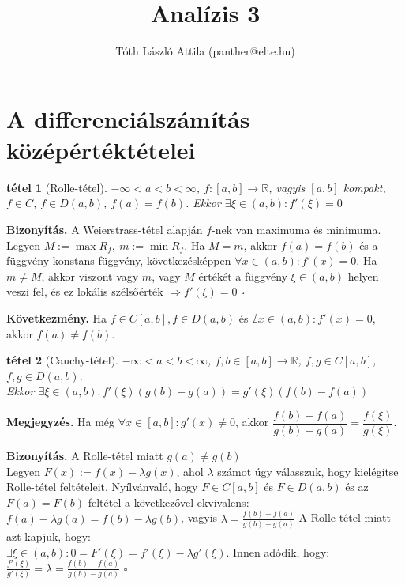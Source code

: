 \documentclass{article}
\title {Analízis 3}
\author{Tóth László Attila (panther@elte.hu)}
\newcommand{\ob}{\hfill$\square$}
\newcommand{\fabk}{f\colon \left[a,b\right]\rightarrow\mathbb{R}}
\newcommand{\fdab}{f\in D(a,b)}
\newcommand{\exist}{\exists}
\newcommand{\la}{\lambda}
\newcommand{\R}{\mathbb{R}}
\newcommand{\di}{\displaystyle}
\theoremstyle{magyar}
\newtheorem{te}{tétel}[section]
\newenvironment{biz}{\begin{trivlist}\item\relax\mbox{\textbf{Bizonyítás.\enskip}}\ignorespaces}{\ob\end{trivlist}}
\newenvironment{kov}{\begin{trivlist}\item\relax\mbox{\textbf{Következmény.\enskip}}\ignorespaces}{\end{trivlist}}
\newenvironment{megj}{\begin{trivlist}\item\relax\mbox{\textbf{Megjegyzés.\enskip}}\ignorespaces}{\end{trivlist}}
\newcommand{\mktoc}{
  \pagenumbering{roman}
  \setcounter{page}{1}
  \lhead{\textbf{\thepage}}
  \cfoot{}
  \tableofcontents
  \newpage
  \lhead{\textbf{\thepage}}%
  \pagenumbering{arabic}
  \setcounter{page}{1}
}
\begin{document}
  \maketitle
  \mktoc

  \newpage
  \setcounter{page}{1}

  \section{A differenciálszámítás középértéktételei}
  \begin{te}[Rolle-tétel]
	 {\rm  \(-\infty < a < b < \infty\), $\fabk$, vagyis $[a,b]$ kompakt,
	  $f\in C$, $\fdab$, $f(a)=f(b)$. Ekkor $\exist \xi \in (a,b): f'(\xi) = 0$
	  }
  \end{te}
  \begin{biz}
    A Weierstrass-tétel alapján $f$-nek van maximuma és minimuma. Legyen
    $M:=\max R_f,\ m:=\min R_f$. Ha $M=m$, akkor $f(a)=f(b)$ és a függvény 
    konstans függvény, következésképpen $\forall x\in(a,b): f'(x)=0$. Ha 
    $m\neq M$, akkor viszont vagy $m$, vagy $M$ értékét a függvény $\xi\in(a,b)$ 
    helyen veszi fel, és ez lokális szélsőérték $\Longrightarrow f'(\xi)=0$
  \end{biz}
  \begin{kov}
    Ha $f\in C[a,b], f\in D(a,b)$ és $\nexists x\in(a,b)\colon f'(x)=0$, akkor 
    $f(a)\not=f(b)$.
  \end{kov}
  \begin{te}[Cauchy-tétel]
    	 {\rm  \(-\infty < a < b < \infty\), $f,b\in\left[a,b\right]\rightarrow\R$,
	  $f,g\in C[a,b]$, $f,g\in D(a,b)$.\\
	  Ekkor $\exist \xi \in (a,b): f'(\xi)(g(b)-g(a)) = g'(\xi)(f(b)-f(a))$
	  }
  \end{te}
  \begin{megj}
    Ha még $\forall x \in [a,b]\colon g'(x) \neq 0$,
    akkor \(\dfrac{f(b)-f(a)}{g(b)-g(a)} = \dfrac{f(\xi)}{g(\xi)}\).    
  \end{megj}
  \begin{biz}
    A Rolle-tétel miatt $g(a)\neq g(b)$\\
    Legyen $F(x):=f(x)-\la{g(x)}$, ahol $\la$ számot úgy válasszuk, hogy 
    kielégítse  Rolle-tétel feltételeit. Nyílvánvaló, hogy $F\in C[a,b]$ és $F\in
    D(a,b)$ és az $F(a)=F(b)$ feltétel a következővel ekvivalens:\\
    $f(a)-\la{g(a)}=f(b)-\la{g(b)}$, vagyis 
    $\di\la=\frac{f(b)-f(a)}{g(b)-g(a)}$
    A Rolle-tétel miatt azt kapjuk, hogy:\\
    $\exists \xi\in(a,b):0=F'(\xi)=f'(\xi)-\la{g'(\xi)}$. Innen adódik, hogy:\\
    $\di\frac{f'(\xi)}{g'(\xi)}=\la=\frac{f(b)-f(a)}{g(b)-g(a)}$
  \end{biz}
\end{document}
